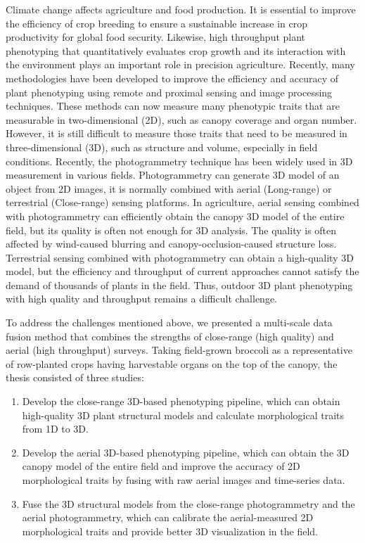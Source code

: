 \begin{doublespace}
Climate change affects agriculture and food production. It is essential to improve the efficiency of crop breeding to ensure a sustainable increase in crop productivity for global food security. Likewise, high throughput plant phenotyping that quantitatively evaluates crop growth and its interaction with the environment plays an important role in precision agriculture. Recently, many methodologies have been developed to improve the efficiency and accuracy of plant phenotyping using remote and proximal sensing and image processing techniques. These methods can now measure many phenotypic traits that are measurable in two-dimensional (2D), such as canopy coverage and organ number. However, it is still difficult to measure those traits that need to be measured in three-dimensional (3D), such as structure and volume, especially in field conditions. Recently, the photogrammetry technique has been widely used in 3D measurement in various fields. Photogrammetry can generate 3D model of an object from 2D images, it is normally combined with aerial (Long-range) or terrestrial (Close-range) sensing platforms. In agriculture, aerial sensing combined with photogrammetry can efficiently obtain the canopy 3D model of the entire field, but its quality is often not enough for 3D analysis. The quality is often affected by wind-caused blurring and canopy-occlusion-caused structure loss. Terrestrial sensing combined with photogrammetry can obtain a high-quality 3D model, but the efficiency and throughput of current approaches cannot satisfy the demand of thousands of plants in the field. Thus, outdoor 3D plant phenotyping with high quality and throughput remains a difficult challenge.

To address the challenges mentioned above, we presented a multi-scale data fusion method that combines the strengths of close-range (high quality) and aerial (high throughput) surveys. Taking field-grown broccoli as a representative of row-planted crops having harvestable organs on the top of the canopy, the thesis consisted of three studies: 

\begin{enumerate}
  \item Develop the close-range 3D-based phenotyping pipeline, which can obtain high-quality 3D plant structural models and calculate morphological traits from 1D to 3D.
  \item Develop the aerial 3D-based phenotyping pipeline, which can obtain the 3D canopy model of the entire field and improve the accuracy of 2D morphological traits by fusing with raw aerial images and time-series data.
  \item Fuse the 3D structural models from the close-range photogrammetry and the aerial photogrammetry, which can calibrate the aerial-measured 2D morphological traits and provide better 3D visualization in the field.
\end{enumerate}


\end{doublespace}

